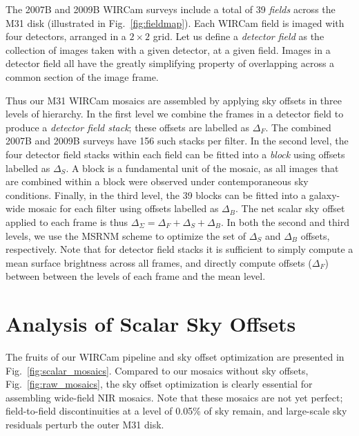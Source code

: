 \documentclass[iop]{emulateapj}
\newcommand{\Fig}[1]{Fig.~\ref{fig:#1}}  %
\begin{document}
The 2007B and 2009B WIRCam surveys include a total of 39 \emph{fields} across the M31 disk (illustrated in \Fig{fieldmap}).
Each WIRCam field is imaged with four detectors, arranged in a $2\times 2$ grid.
Let us define a \emph{detector field} as the collection of images taken with a given detector, at a given field.
Images in a detector field all have the greatly simplifying property of overlapping across a common section of the image frame.

Thus our M31 WIRCam mosaics are assembled by applying sky offsets in three levels of hierarchy.
In the first level we combine the frames in a detector field to produce a \emph{detector field stack}; these offsets are labelled as $\Delta_F$.
The combined 2007B and 2009B surveys have 156 such stacks per filter.
In the second level, the four detector field stacks within each field can be fitted into a \emph{block} using offsets labelled as $\Delta_S$.
A block is a fundamental unit of the mosaic, as all images that are combined within a block were observed under contemporaneous sky conditions.
Finally, in the third level, the 39 blocks can be fitted into a galaxy-wide mosaic for each filter using offsets labelled as $\Delta_B$.
The net scalar sky offset applied to each frame is thus $\Delta_\Sigma = \Delta_F + \Delta_S + \Delta_B$.
In both the second and third levels, we use the MSRNM scheme to optimize the set of $\Delta_S$ and $\Delta_B$ offsets, respectively.
Note that for detector field stacks it is sufficient to simply compute a mean surface brightness across all frames, and directly compute offsets ($\Delta_F$) between between the levels of each frame and the mean level.

\section{Analysis of Scalar Sky Offsets}
\label{sec:scalaranalysis}

The fruits of our WIRCam pipeline and sky offset optimization are presented in \Fig{scalar_mosaics}.
Compared to our mosaics without sky offsets, \Fig{raw_mosaics}, the sky offset optimization is clearly essential for assembling wide-field NIR mosaics.
Note that these mosaics are not yet perfect; field-to-field discontinuities at a level of 0.05\% of sky remain, and large-scale sky residuals perturb the outer M31 disk.
\end{document}
